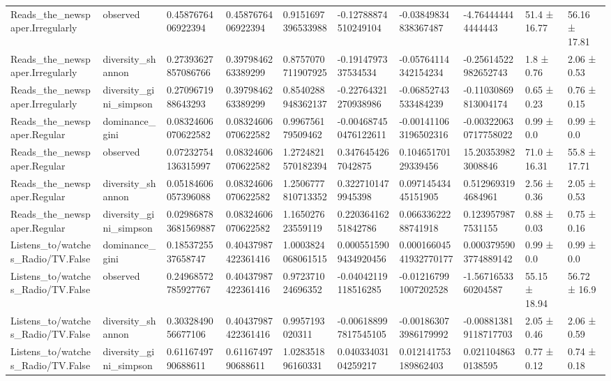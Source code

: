 \begin{longtable}{llllllllll}
Reads\_the\_newspaper.Irregularly & observed & 0.4587676406922394 & 0.4587676406922394 & 0.9151697396533988 & -0.12788874510249104 & -0.03849834838367487 & -4.764444444444443 & 51.4 ± 16.77 & 56.16 ± 17.81 \\
Reads\_the\_newspaper.Irregularly & diversity\_shannon & 0.27393627857086766 & 0.3979846263389299 & 0.8757070711907925 & -0.1914797337534534 & -0.05764114342154234 & -0.25614522982652743 & 1.8 ± 0.76 & 2.06 ± 0.53 \\
Reads\_the\_newspaper.Irregularly & diversity\_gini\_simpson & 0.2709671988643293 & 0.3979846263389299 & 0.8540288948362137 & -0.22764321270938986 & -0.06852743533484239 & -0.11030869813004174 & 0.65 ± 0.23 & 0.76 ± 0.15 \\
Reads\_the\_newspaper.Regular & dominance\_gini & 0.08324606070622582 & 0.08324606070622582 & 0.996756179509462 & -0.004687450476122611 & -0.001411063196502316 & -0.003220630717758022 & 0.99 ± 0.0 & 0.99 ± 0.0 \\
Reads\_the\_newspaper.Regular & observed & 0.07232754136315997 & 0.08324606070622582 & 1.2724821570182394 & 0.3476454267042875 & 0.10465170129339456 & 15.203539823008846 & 71.0 ± 16.31 & 55.8 ± 17.71 \\
Reads\_the\_newspaper.Regular & diversity\_shannon & 0.05184606057396088 & 0.08324606070622582 & 1.2506777810713352 & 0.3227101479945398 & 0.09714543445151905 & 0.5129693194684961 & 2.56 ± 0.36 & 2.05 ± 0.53 \\
Reads\_the\_newspaper.Regular & diversity\_gini\_simpson & 0.029868783681569887 & 0.08324606070622582 & 1.165027623559119 & 0.22036416251842786 & 0.06633622288741918 & 0.1239579877531155 & 0.88 ± 0.03 & 0.75 ± 0.16 \\
Listens\_to/watches\_Radio/TV.False & dominance\_gini & 0.1853725537658747 & 0.40437987422361416 & 1.0003824068061515 & 0.0005515909434920456 & 0.00016604541932770177 & 0.0003795903774889142 & 0.99 ± 0.0 & 0.99 ± 0.0 \\
Listens\_to/watches\_Radio/TV.False & observed & 0.24968572785927767 & 0.40437987422361416 & 0.972371024696352 & -0.04042119118516285 & -0.012167991007202528 & -1.5671653360204587 & 55.15 ± 18.94 & 56.72 ± 16.9 \\
Listens\_to/watches\_Radio/TV.False & diversity\_shannon & 0.3032849056677106 & 0.40437987422361416 & 0.9957193020311 & -0.006188997817545105 & -0.001863073986179992 & -0.008813819118717703 & 2.05 ± 0.46 & 2.06 ± 0.59 \\
Listens\_to/watches\_Radio/TV.False & diversity\_gini\_simpson & 0.6116749790688611 & 0.6116749790688611 & 1.028351896160331 & 0.04033403104259217 & 0.012141753189862403 & 0.0211048630138595 & 0.77 ± 0.12 & 0.74 ± 0.18 \\

\end{longtable}
